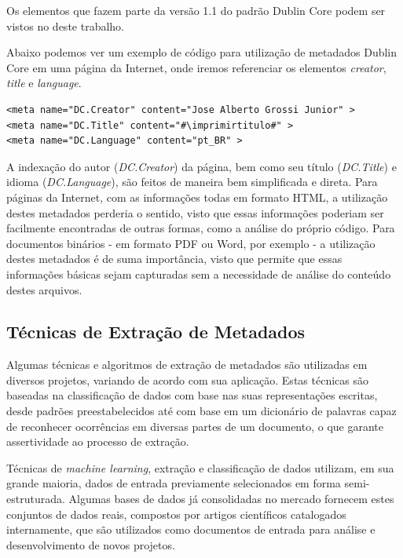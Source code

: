 Os elementos que fazem parte da versão 1.1 do padrão Dublin Core \cite{dublin-core-1-1} podem ser vistos no  deste trabalho.

Abaixo podemos ver um exemplo de código para utilização de metadados Dublin Core em uma página da Internet, onde iremos referenciar os elementos \textit{creator}, \textit{title} e \textit{language}.

\lstset{language=HTML}
\begin{lstlisting}[escapechar=\#]
<meta name="DC.Creator" content="Jose Alberto Grossi Junior" >
<meta name="DC.Title" content="#\imprimirtitulo#" >
<meta name="DC.Language" content="pt_BR" >
\end{lstlisting}

A indexação do autor (\textit{DC.Creator}) da página, bem como seu título (\textit{DC.Title}) e idioma (\textit{DC.Language}), são feitos de maneira bem simplificada e direta. Para páginas da Internet, com as informações todas em formato HTML, a utilização destes metadados perderia o sentido, visto que essas informações poderiam ser facilmente encontradas de outras formas, como a análise do próprio código. Para documentos binários - em formato PDF ou Word, por exemplo - a utilização destes metadados é de suma importância, visto que permite que essas informações básicas sejam capturadas sem a necessidade de análise do conteúdo destes arquivos.

\subsection{Técnicas de Extração de Metadados}
\label{ssec:metadata-techniques}

Algumas técnicas e algoritmos de extração de metadados são utilizadas em diversos projetos, variando de acordo com sua aplicação. Estas técnicas são baseadas na classificação de dados com base nas suas representações escritas, desde padrões preestabelecidos até com base em um dicionário de palavras capaz de reconhecer ocorrências em diversas partes de um documento, o que garante assertividade ao processo de extração.

Técnicas de \emph{machine learning}, extração e classificação de dados utilizam, em sua grande maioria, dados de entrada previamente selecionados em forma semi-estruturada. Algumas bases de dados já consolidadas no mercado fornecem estes conjuntos de dados reais, compostos por artigos científicos catalogados internamente, que são utilizados como documentos de entrada para análise e desenvolvimento de novos projetos.

